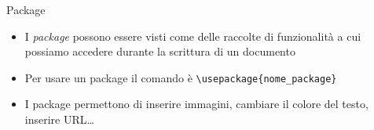 \begin{frame}{Package}

\begin{itemize}
\item I \emph{package} possono essere visti come delle raccolte di funzionalità a cui possiamo accedere durante la scrittura di un documento

\vfill

\item Per usare un package il comando è 
\texttt{\textbackslash{}usepackage\{nome\_package\}}

\vfill

\item I package permettono di inserire immagini, cambiare il colore del testo,
inserire URL\dots{}

\end{itemize}

\end{frame}